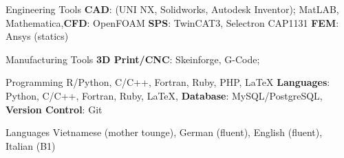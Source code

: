 

\begin{cvskills}

  \cvskill
    {Engineering Tools} %
    {\textbf{CAD}: (UNI NX, Solidworks, Autodesk Inventor); MatLAB, Mathematica,\newline \textbf{CFD}: OpenFOAM
    \newline \textbf{SPS}: TwinCAT3, Selectron CAP1131
	\newline \textbf{FEM}: Ansys (statics)} %

  \cvskill
    {Manufacturing Tools} %
    {\textbf{3D Print/CNC}: Skeinforge, G-Code;} %

  \cvskill
    {Programming} %
    {R/Python, C/C++, Fortran, Ruby, PHP, LaTeX \newline%
    \textbf{Languages}: Python, C/C++, Fortran, Ruby, LaTeX, 
    	\newline \textbf{Database}: MySQL/PostgreSQL,
    	\newline \textbf{Version Control}: Git} %


  \cvskill
    {Languages} %
    {Vietnamese (mother tounge), German (fluent), English (fluent), Italian (B1)} %

\end{cvskills}
